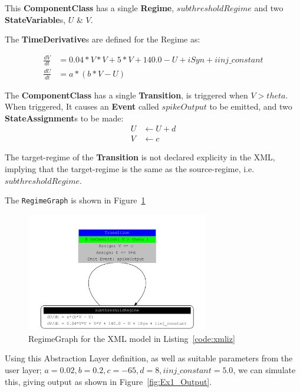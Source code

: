 \documentclass{article}
\newcommand{\ComponentClass}{{\bf{ComponentClass}}\xspace}
\newcommand{\StateVariables}{{\bf{StateVariable}}s\xspace}
\newcommand{\StateAssignments}{{\bf{StateAssignment}}s\xspace}
\newcommand{\TimeDerivatives}{{\bf{TimeDerivative}}s\xspace}
\newcommand{\Event}{{\bf{Event}}\xspace}
\newcommand{\Regime}{{\bf{Regime}}\xspace}
\newcommand{\Transition}{{\bf{Transition}}\xspace}
\begin{document}
\noindent
This \ComponentClass has a single \Regime, $subthresholdRegime$ and two
\StateVariables, $U$ \& $V$. 

\noindent
The \TimeDerivatives are defined for the Regime as:

\begin{align}
\frac{dV}{dt} &= 0.04*V*V + 5*V + 140.0 - U + iSyn + iinj\_constant   \\
\frac{dU}{dt} &= a * ( b* V -U )
\end{align}

\noindent
The \ComponentClass has a single \Transition, is triggered when $V>theta$. When
triggered, It causes an \Event called $spikeOutput$ to be emitted, and two
\StateAssignments to be made:
\begin{align}
U &\leftarrow U + d \\
V &\leftarrow c
\end{align}

The target-regime of the \Transition is not declared explicity in the XML, implying that the
target-regime is the same as the source-regime, i.e. $subthresholdRegime$.

The {\tt RegimeGraph} is shown in Figure~\ref{fig:EX1_RegimeGraph}

\begin{figure}[htb!]
\center
\includegraphics[width=8cm]{figures/example_IzRegimeTransGraph.pdf}
\protect\caption{RegimeGraph for the XML model in Listing~\ref{code:xmliz}}
\label{fig:EX1_RegimeGraph}
\end{figure}


Using this Abstraction Layer definition, as well as suitable parameters from the
user layer; $a=0.02, b=0.2, c=-65, d= 8, iinj\_constant= 5.0$, we can simulate
this, giving output as shown in Figure~\ref{fig:Ex1_Output}.
\end{document}
